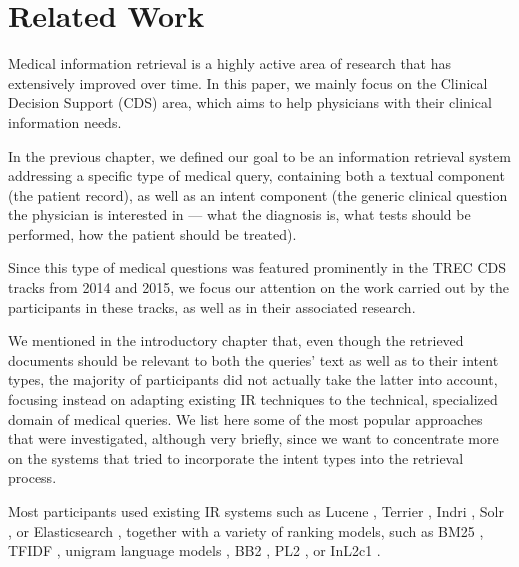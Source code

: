 \chapter{Related Work} \label{related}

Medical information retrieval is a highly active area of research that has extensively improved over time.
In this paper, we mainly focus on the Clinical Decision Support (CDS) area, which aims to help
physicians with their clinical information needs.

In the previous chapter, we defined our goal to be
an information retrieval system addressing a specific type of medical query,
containing both a textual component (the patient record), as well as an intent component
(the generic clinical question the physician is interested in
--- what the diagnosis is, what tests should be performed, how the patient should be treated).

Since this type of medical questions was featured prominently in the TREC CDS tracks from 2014 and 2015,
we focus our attention on the work carried out by the participants in these tracks, as well as in
 their associated research.

We mentioned in the introductory chapter that, even though the retrieved documents should be
relevant to both the queries' text as well as to their intent types, the majority of participants
did not actually take the latter into account, focusing instead on adapting existing
IR techniques to the technical, specialized domain of medical queries. We list here some of the most
popular approaches that were investigated, although very briefly, since we want to concentrate more on the systems that
tried to incorporate the intent types into the retrieval process.

Most participants used existing IR systems such as
Lucene \cite{ucla, goodwin2014utd, jiang2016clinical, oh2014kisti, novasearch, CSEIITV, wei2014atigeo},
Terrier \cite{dinh2014crp, snomeddawit, bitem, waterloo, song2015ecnu, mutrec, sankhavara2014fusing, cuhk},
Indri \cite{ir.cs.sfsu, choi, duth, wei2014atigeo, wsuir},
Solr \cite{waterloo},
or Elasticsearch \cite{lamda2015},
together with a variety of ranking models, such as
BM25 \cite{dinh2014crp, snomeddawit, bitem, goodwin2014utd, novasearch, song2015ecnu},
TFIDF \cite{dinh2014crp, ucla, novasearch},
unigram language models \cite{ir.cs.sfsu, choi, ucla, oh2014kisti, novasearch},
BB2 \cite{song2015ecnu},
PL2 \cite{waterloo, song2015ecnu},
or InL2c1 \cite{snomeddawit}.

